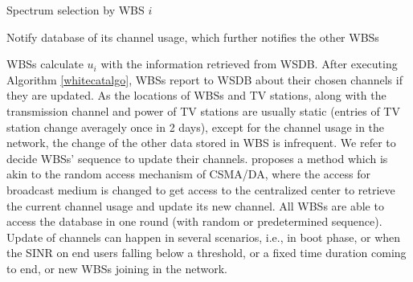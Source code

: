 \documentclass[times]{ettauth}
\newcommand{\ie}{i.e., }
\theoremstyle{mytheoremstyle}
\theoremstyle{mytheoremstyle}
\theoremstyle{mytheoremstyle}
\begin{document}
\begin{algorithm}[h]
\caption{Spectrum selection by WBS $i$}          %
\label{whitecatalgo} 
\DontPrintSemicolon
\SetAlgoLined
{}

	
Notify database of its channel usage, which further notifies the other WBSs

\end{algorithm}



WBSs calculate $u_i$ with the information retrieved from WSDB.
After executing Algorithm \ref{whitecatalgo}, WBSs report to WSDB about their chosen channels if they are updated.
As the locations of WBSs and TV stations, along with the transmission channel and power of TV stations are usually static (entries of TV station change averagely once in 2 days\cite{SenseLess2011}), except for the channel usage in the network, the change of the other data stored in WBS is infrequent. 
We refer \cite{CApotentialLearning_05dyspan} to decide WBSs' sequence to update their channels.
\cite{CApotentialLearning_05dyspan} proposes a method which is akin to the random access mechanism of CSMA/DA, where the access for broadcast medium is changed to get access to the centralized center to retrieve the current channel usage and update its new channel. 
All WBSs are able to access the database in one round (with random or predetermined sequence). 
Update of channels can happen in several scenarios, \ie in boot phase, or when the SINR on end users falling below a threshold, or a fixed time duration coming to end, or new WBSs joining in the network. 
\end{document}
